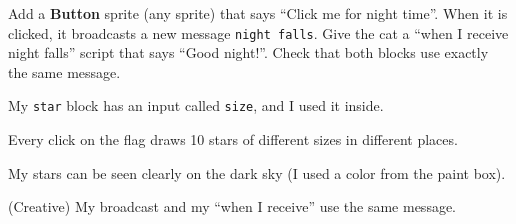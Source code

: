\begin{creative}
Add a \textbf{Button} sprite (any sprite) that says \enquote{Click me for night time}. When it is clicked, it broadcasts a new message \texttt{night falls}. Give the cat a \enquote{when I receive night falls} script that says \enquote{Good night!}. Check that both blocks use exactly the same message.
\end{creative}

\begin{selfcheck}
  \item My \texttt{star} block has an input called \texttt{size}, and I used it inside.
  \item Every click on the flag draws 10 stars of different sizes in different places.
  \item My stars can be seen clearly on the dark sky (I used a color from the paint box).
  \item (Creative) My broadcast and my \enquote{when I receive} use the same message.
\end{selfcheck}
